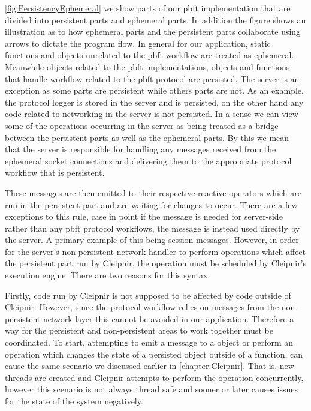 \autoref{fig:PersistencyEphemeral} we show parts of our \ac{pbft} implementation that are divided into persistent parts and ephemeral parts. In addition the figure shows an illustration as to how ephemeral parts and the persistent parts collaborate using arrows to dictate the program flow. In general for our application, static functions and objects unrelated to the \ac{pbft} workflow are treated as ephemeral. Meanwhile objects related to the \ac{pbft} implementations,  objects and functions that handle workflow related to the \ac{pbft} protocol are persisted. The server is an exception as some parts are persistent while others parts are not. As an example, the protocol logger is stored in the server and is persisted, on the other hand any code related to networking in the server is not persisted. In a sense we can view some of the operations occurring in the server as being treated as a bridge between the persistent parts as well as the ephemeral parts. By this we mean that the server is responsible for handling any messages received from the ephemeral socket connections and delivering them to the appropriate protocol workflow that is persistent. 

These messages are then emitted to their respective reactive operators which are run in the persistent part and are waiting for changes to occur. There are a few exceptions to this rule, case in point if the message is needed for server-side rather than any \ac{pbft} protocol workflows, the message is instead used directly by the server. A primary example of this being session messages. However, in order for the server's non-persistent network handler to perform operations which affect the persistent part run by Cleipnir, the operation must be scheduled by Cleipnir's execution engine. There are two reasons for this syntax. 

Firstly, code run by Cleipnir is not supposed to be affected by code outside of Cleipnir. However, since the protocol workflow relies on messages from the non-persistent network layer this cannot be avoided in our application. Therefore a way for the persistent and non-persistent areas to work together must be coordinated. To start, attempting to emit a message to a  object or perform an operation which changes the state of a persisted object outside of a  function, can cause the same scenario we discussed earlier in \autoref{chapter:Cleipnir}. That is, new threads are created and Cleipnir attempts to perform the operation concurrently, however this scenario is not always thread safe and sooner or later causes issues for the state of the system negatively. 

